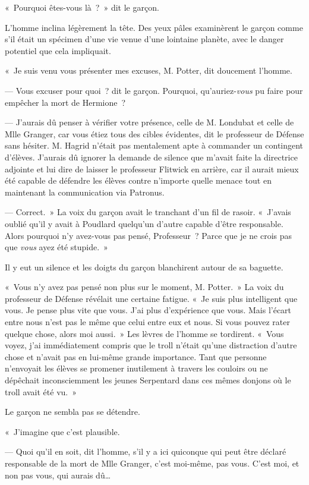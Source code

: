 «~Pourquoi êtes-vous là~?~» dit le garçon.

L'homme inclina légèrement la tête. Des yeux pâles examinèrent le garçon comme s'il était un spécimen d'une vie venue d'une lointaine planète, avec le danger potentiel que cela impliquait.

«~Je suis venu vous présenter mes excuses, M. Potter, dit doucement l'homme.

--- Vous excuser pour quoi~? dit le garçon. Pourquoi, qu'auriez-\emph{vous} pu faire pour empêcher la mort de Hermione~?

--- J'aurais dû penser à vérifier votre présence, celle de M. Londubat et celle de Mlle Granger, car vous étiez tous des cibles évidentes, dit le professeur de Défense sans hésiter. M. Hagrid n'était pas mentalement apte à commander un contingent d'élèves. J'aurais dû ignorer la demande de silence que m'avait faite la directrice adjointe et lui dire de laisser le professeur Flitwick en arrière, car il aurait mieux été capable de défendre les élèves contre n'importe quelle menace tout en maintenant la communication via Patronus.

--- Correct.~» La voix du garçon avait le tranchant d'un fil de rasoir. «~J'avais oublié qu'il y avait à Poudlard quelqu'un d'autre capable d'être responsable. Alors pourquoi n'y avez-vous pas pensé, Professeur~? Parce que je ne crois pas que \emph{vous} ayez été stupide.~»

Il y eut un silence et les doigts du garçon blanchirent autour de sa baguette.

«~Vous n'y avez pas pensé non plus sur le moment, M. Potter.~» La voix du professeur de Défense révélait une certaine fatigue. «~Je suis plus intelligent que vous. Je pense plus vite que vous. J'ai plus d'expérience que vous. Mais l'écart entre nous n'est pas le même que celui entre eux et nous. Si vous pouvez rater quelque chose, alors moi aussi.~» Les lèvres de l'homme se tordirent. «~Vous voyez, j'ai immédiatement compris que le troll n'était qu'une distraction d'autre chose et n'avait pas en lui-même grande importance. Tant que personne n'envoyait les élèves se promener inutilement à travers les couloirs ou ne dépêchait inconsciemment les jeunes Serpentard dans ces mêmes donjons où le troll avait été vu.~»

Le garçon ne sembla pas se détendre.

«~J'imagine que c'est plausible.

--- Quoi qu'il en soit, dit l'homme, s'il y a ici quiconque qui peut être déclaré responsable de la mort de Mlle Granger, c'est moi-même, pas vous. C'est moi, et non pas vous, qui aurais dû…

